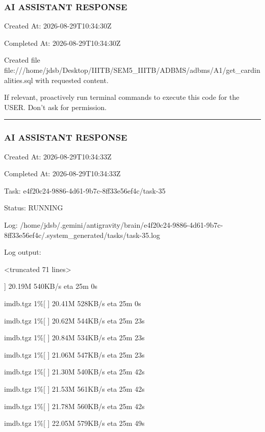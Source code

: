 \documentclass[11pt,a4paper]{article}
\begin{document}
\subsubsection{AI ASSISTANT RESPONSE}

Created At: 2026-08-29T10:34:30Z

Completed At: 2026-08-29T10:34:30Z

Created file file:///home/jdsb/Desktop/IIITB/SEM5\_IIITB/ADBMS/adbms/A1/get\_cardinalities.sql with requested content.

If relevant, proactively run terminal commands to execute this code for the USER. Don't ask for permission.


\hrule

\subsubsection{AI ASSISTANT RESPONSE}

Created At: 2026-08-29T10:34:33Z

Completed At: 2026-08-29T10:34:33Z

Task: e4f20c24-9886-4d61-9b7c-8ff33e56ef4c/task-35

Status: RUNNING

Log: /home/jdsb/.gemini/antigravity/brain/e4f20c24-9886-4d61-9b7c-8ff33e56ef4c/.system\_generated/tasks/task-35.log

Log output:

<truncated 71 lines>

]  20.19M   540KB/s    eta 25m 0s

imdb.tgz              1\%[                    ]  20.41M   528KB/s    eta 25m 0s

imdb.tgz              1\%[                    ]  20.62M   544KB/s    eta 25m 23s

imdb.tgz              1\%[                    ]  20.84M   534KB/s    eta 25m 23s

imdb.tgz              1\%[                    ]  21.06M   547KB/s    eta 25m 23s

imdb.tgz              1\%[                    ]  21.30M   540KB/s    eta 25m 42s

imdb.tgz              1\%[                    ]  21.53M   561KB/s    eta 25m 42s

imdb.tgz              1\%[                    ]  21.78M   560KB/s    eta 25m 42s

imdb.tgz              1\%[                    ]  22.05M   579KB/s    eta 25m 49s
\end{document}
